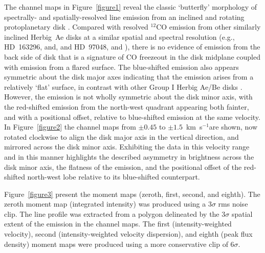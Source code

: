 \documentclass[onecolumn]{aastex6}
\newcommand{\kms}{km~s$^{-1}$}
\begin{document}
The channel maps in Figure~\ref{figure1} reveal the classic `butterfly' morphology of
spectrally- and spatially-resolved line emission from an inclined
and rotating protoplanetary disk \citep[see, e.g.,][]{semenov08}.
Compared with resolved $^{12}$CO emission from other similarly inclined Herbig~Ae disks
at a similar spatial and spectral resolution
(e.g., HD~163296, \citealt{degregorio13} and\citealt{rosenfeld13}, and
HD~97048, \citealt{walsh16} and \citet{vanderplas17}),
there is no evidence of emission from the back side of disk that is a
signature of CO freezeout in the disk midplane coupled with
emission from a flared surface.
The blue-shifted emission also appears symmetric about the disk major axes
indicating that the emission arises from a relatively `flat' surface,
in contrast with other Group I Herbig Ae/Be disks
\citep[e.g., HD~97048,][]{walsh16,vanderplas17}.
However, the emission is not wholly symmetric about the disk minor axis,
with the red-shifted emission from the north-west quadrant appearing both
fainter, and with a positional offset, relative to blue-shifted
emission at the same velocity.
In Figure~\ref{figure2} the channel maps from $\pm 0.45$ to $\pm 1.5$~\kms are
shown, now rotated clockwise to align the disk major axis in the vertical direction, and
mirrored across the disk minor axis.
Exhibiting the data in this velocity range and in this manner highlights
the described asymmetry in brightness across the disk minor axis, the flatness of the emission, and
the positional offset of the red-shifted north-west lobe relative to
its blue-shifted counterpart.

%

Figure~\ref{figure3} present the moment maps
(zeroth, first, second, and eighth).
The zeroth moment map (integrated intensity) was produced using
a $3\sigma$ rms noise clip.
The line profile was extracted from a polygon delineated by the
$3\sigma$ spatial extent of the emission in the channel maps.
The first (intensity-weighted velocity), second (intensity-weighted velocity dispersion),
and eighth (peak flux density) moment maps were produced using a more
conservative clip of $6\sigma$.
\end{document}
